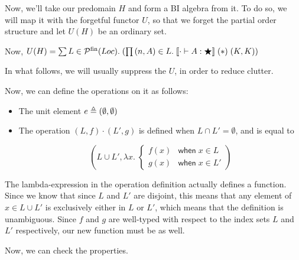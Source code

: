 Now, we'll take our predomain $H$ and form a BI algebra from it. To do so, we will
map it with the forgetful functor $U$, so that we forget the partial order structure 
and let $U(H)$ be an ordinary set. 

Now, $U(H) = \sum L \in \powersetfin{Loc}.\; (\prod \sempair{n}{A} \in L.\; \interp{\judgeWK[\cdot]{A}{\bigstar}}\;(*)\;(K,K))$

In what follows, we will usually suppress the $U$, in order to reduce clutter. 

Now, we can define the operations on it as follows: 

\begin{itemize}
\item The unit element $e \triangleq \sempair{\emptyset}{\emptyset}$
\item The operation $(L, f) \cdot (L', g)$ is defined when $L \cap L' = \emptyset$, and
      is equal to 

\begin{displaymath}
 \left(L \cup L', \lambda x.\;\left\{\begin{array}{ll}
                                 f(x) & \mathsf{when}\; x \in L \\
                                 g(x) & \mathsf{when}\; x \in L'
                               \end{array}
                         \right.\right)
 \end{displaymath}
\end{itemize}

The lambda-expression in the operation definition actually defines a
function. Since we know that since $L$ and $L'$ are disjoint, this
means that any element of $x \in L \cup L'$ is exclusively either in
$L$ or $L'$, which means that the definition is unambiguous. Since $f$
and $g$ are well-typed with respect to the index sets $L$ and $L'$
respectively, our new function must be as well.

Now, we can check the properties. 

